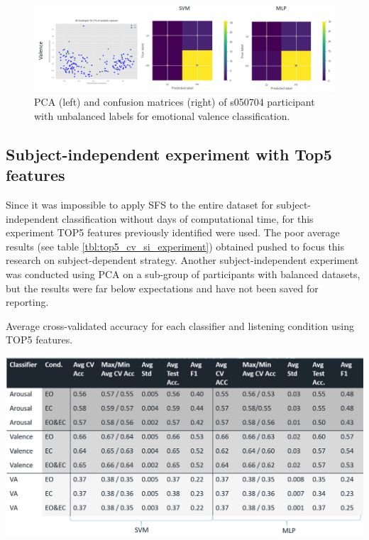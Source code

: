 \begin{figure}[!htb]
\includegraphics[width=16cm]{img/appendix/valence_unbalanced_pca_confusion.png}
\centering
\caption{PCA (left) and confusion matrices (right) of s050704 participant with unbalanced labels for emotional valence 
classification.}\label{fig:valence_unbalanced_pca_confusion}
\end{figure}
\FloatBarrier

\subsection{Subject-independent experiment with Top5 features}
\label{sec:appendix_A3.5}
Since it was impossible to apply \ac{SFS} to the entire dataset for subject-independent classification without days of computational time, for this experiment TOP5 features previously identified were used. The poor average results (see table \ref{tbl:top5_cv_si_experiment}) obtained pushed to focus this research on subject-dependent strategy. Another subject-independent experiment was conducted using \ac{PCA} on a sub-group of participants with balanced datasets, but the results were far below expectations and have not been saved for reporting.

\begin{table}[h!]
  \caption{ Average cross-validated accuracy for each classifier and listening condition using TOP5 features.}
  \label{tbl:top5_cv_si_experiment}
  \includegraphics[width=\linewidth]{img/appendix/top5_cv_si_experiment.png}
\end{table}
\FloatBarrier

